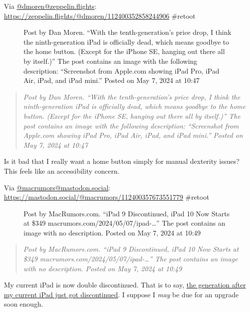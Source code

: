 Via \href{https://zeppelin.flights/@dmoren/}{@dmoren@zeppelin.flights}:
\url{https://zeppelin.flights/@dmoren/112400352858244906} \#retoot

\begin{figure}
\centering
{}
\caption{Post by Dan Moren. ``With the tenth-generation's price drop, I
think the ninth-generation iPad is officially dead, which means goodbye
to the home button. (Except for the iPhone SE, hanging out there all by
itself.)'' The post contains an image with the following description:
``Screenshot from Apple.com showing iPad Pro, iPad Air, iPad, and iPad
mini.'' Posted on May 7, 2024 at 10:47}
\end{figure}

\begin{quote}
\emph{Post by Dan Moren. ``With the tenth-generation's price drop, I
think the ninth-generation iPad is officially dead, which means goodbye
to the home button. (Except for the iPhone SE, hanging out there all by
itself.)'' The post contains an image with the following description:
``Screenshot from Apple.com showing iPad Pro, iPad Air, iPad, and iPad
mini.'' Posted on May 7, 2024 at 10:47}
\end{quote}

Is it bad that I really want a home button simply for manual dexterity
issues? This feels like an accessibility concern.

Via
\href{https://mastodon.social/@macrumors/}{@macrumors@mastodon.social}:
\url{https://mastodon.social/@macrumors/112400357673551779} \#retoot

\begin{figure}
\centering
{}
\caption{Post by MacRumors.com. ``iPad 9 Discontinued, iPad 10 Now
Starts at \$349 macrumors.com/2024/05/07/ipad-\ldots{}'' The post
contains an image with no description. Posted on May 7, 2024 at 10:49}
\end{figure}

\begin{quote}
\emph{Post by MacRumors.com. ``iPad 9 Discontinued, iPad 10 Now Starts
at \$349 macrumors.com/2024/05/07/ipad-\ldots{}'' The post contains an
image with no description. Posted on May 7, 2024 at 10:49}
\end{quote}

My current iPad is now double discontinued. That is to say,
\href{https://www.macrumors.com/2024/05/07/ipad-9-discontinued-ipad-10-now-starts-at-349/}{the
generation after my current iPad just got discontinued}. I suppose I
\emph{may} be due for an upgrade soon enough.

